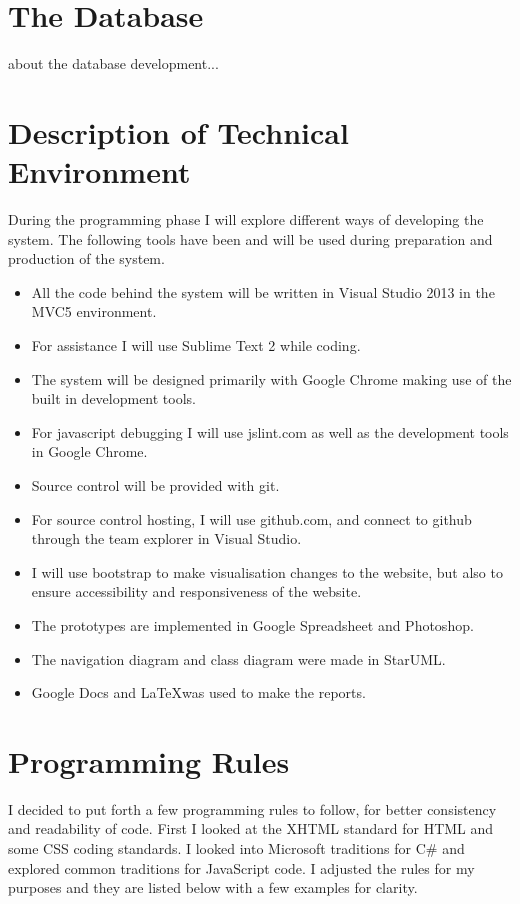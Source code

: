 \documentclass[paper=a4, fontsize=11pt]{scrartcl} %
\numberwithin{equation}{section} %
\numberwithin{figure}{section} %
\numberwithin{table}{section} %
\begin{document}
\section{The Database}
about the database development... 

\section{Description of Technical Environment}
During the programming phase I will explore different ways of developing the system. The following tools have been and will be used during preparation and production of the system.
\begin{itemize}
  \item All the code behind the system will be written in Visual Studio 2013 in the MVC5 environment.
  \item For assistance I will use Sublime Text 2 while coding.
  \item The system will be designed primarily with Google Chrome making use of the built in development tools.
  \item For javascript debugging I will use jslint.com as well as the development tools in Google Chrome.
  \item Source control will be provided with git.
  \item For source control hosting, I will use github.com, and connect to github through the team explorer in Visual Studio.
  \item I will use bootstrap to make visualisation changes to the website, but also to ensure accessibility and responsiveness of the website.
  \item The prototypes are implemented in Google Spreadsheet and Photoshop.
  \item The navigation diagram and class diagram were made in StarUML.
  \item Google Docs and \LaTeX \enspace was used to make the reports.
\end{itemize}

\section{Programming Rules}
I decided to put forth a few programming rules to follow, for better consistency and readability of code. First I looked at the XHTML standard for HTML and some CSS coding standards. I looked into Microsoft traditions for C\# and explored common traditions for JavaScript code. I adjusted the rules for my purposes and they are listed below with a few examples for clarity.
\end{document}
